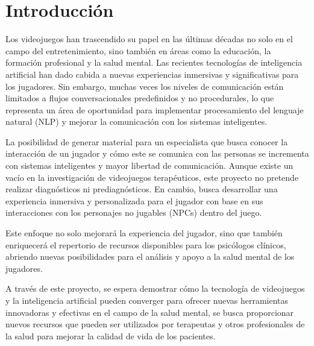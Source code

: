 \documentclass[12pt,twoside]{article}
\begin{document}
	\clearpage
	
	\renewcommand{\contentsname}{Indice}
	
	\tableofcontents
	
	\restoregeometry
		
	\clearpage
		
	\section{Introducción}
	
	Los videojuegos han trascendido su papel en las últimas décadas no solo en el campo del entretenimiento, sino también en áreas como la educación, la formación profesional y la salud mental. Las recientes tecnologías de inteligencia artificial han dado cabida a nuevas experiencias inmersivas y significativas para los jugadores. Sin embargo, muchas veces los niveles de comunicación están limitados a flujos conversacionales predefinidos y no procedurales, lo que representa un área de oportunidad para implementar procesamiento del lenguaje natural (NLP) y mejorar la comunicación con los sistemas inteligentes.
	
	La posibilidad de generar material para un especialista que busca conocer la interacción de un jugador y cómo este se comunica con las personas se incrementa con sistemas inteligentes y mayor libertad de comunicación. Aunque existe un vacío en la investigación de videojuegos terapéuticos, este proyecto no pretende realizar diagnósticos ni prediagnósticos. En cambio, busca desarrollar una experiencia inmersiva y personalizada para el jugador con base en sus interacciones con los personajes no jugables (NPCs) dentro del juego.
	
	Este enfoque no solo mejorará la experiencia del jugador, sino que también enriquecerá el repertorio de recursos disponibles para los psicólogos clínicos, abriendo nuevas posibilidades para el análisis y apoyo a la salud mental de los jugadores.
	
	A través de este proyecto, se espera demostrar cómo la tecnología de videojuegos y la inteligencia artificial pueden converger para ofrecer nuevas herramientas innovadoras y efectivas en el campo de la salud mental, se busca proporcionar nuevos recursos que pueden ser utilizados por terapeutas y otros profesionales de la salud para mejorar la calidad de vida de los pacientes.
	
\end{document}

